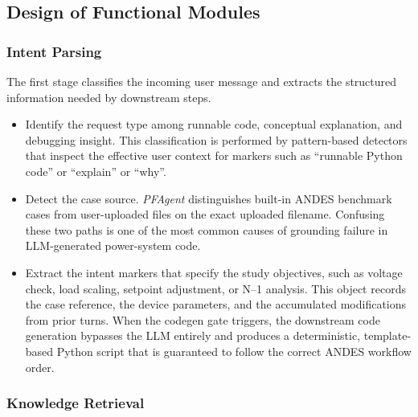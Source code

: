 \documentclass[journal]{IEEEtran}
\begin{document}
\subsection{Design of Functional Modules}

\subsubsection{Intent Parsing}

The first stage classifies the incoming user message and extracts the structured information needed by downstream steps.
\begin{itemize}
\item Identify the request type among runnable code, conceptual explanation, and debugging insight. This classification is performed by pattern-based detectors that inspect the effective user context for markers such as ``runnable Python code'' or ``explain'' or ``why''.
\item Detect the case source. \emph{PFAgent} distinguishes built-in ANDES benchmark cases from user-uploaded files on the exact uploaded filename. 
Confusing these two paths is one of the most common causes of grounding failure in LLM-generated power-system code.
\item Extract the intent markers that specify the study objectives, such as voltage check, load scaling, setpoint adjustment, or N--1 analysis.
This object records the case reference, the device parameters, and the accumulated modifications from prior turns.
When the codegen gate triggers, the downstream code generation bypasses the LLM entirely and produces a deterministic, template-based Python script that is guaranteed to follow the correct ANDES workflow order.
\end{itemize}

\subsubsection{Knowledge Retrieval}
\end{document}
